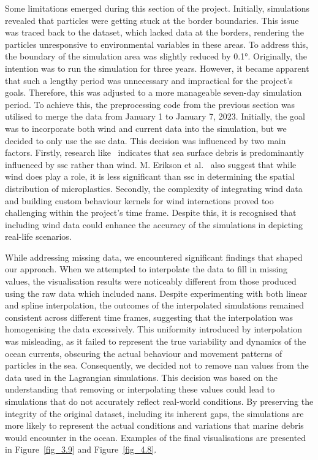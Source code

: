 Some limitations emerged during this section of the project. Initially,  simulations revealed that particles were getting stuck at the border boundaries. This issue was traced back to the dataset, which lacked data at the borders, rendering the particles unresponsive to environmental variables in these areas. To address this, the boundary of the simulation area was slightly reduced by 0.1°. Originally, the intention was to run the simulation for three years. However, it became apparent that such a lengthy period was unnecessary and impractical for the project's goals. Therefore, this was adjusted to a more manageable seven-day simulation period. To achieve this, the preprocessing code from the previous section was utilised to merge the data from January 1 to January 7, 2023. Initially, the goal was to incorporate both wind and current data into the simulation, but we decided to only use the \acrshort{ssc} data. This decision was influenced by two main factors. Firstly, research like~\cite{48} indicates that sea surface debris is predominantly influenced by \acrshort{ssc} rather than wind. M. Erikson et al.~\cite{48} also suggest that while wind does play a role, it is less significant than \acrshort{ssc} in determining the spatial distribution of microplastics. Secondly, the complexity of integrating wind data and building custom behaviour kernels for wind interactions proved too challenging within the project's time frame. Despite this, it is recognised that including wind data could enhance the accuracy of the simulations in depicting real-life scenarios.

While addressing missing data, we encountered significant findings that shaped our approach. When we attempted to interpolate the data to fill in missing values, the visualisation results were noticeably different from those produced using the raw data which included \acrshort{nan}s. Despite experimenting with both linear and spline interpolation, the outcomes of the interpolated simulations remained consistent across different time frames, suggesting that the interpolation was homogenising the data excessively. This uniformity introduced by interpolation was misleading, as it failed to represent the true variability and dynamics of the ocean currents, obscuring the actual behaviour and movement patterns of particles in the sea. Consequently, we decided not to remove \acrshort{nan} values from the data used in the Lagrangian simulations. This decision was based on the understanding that removing or interpolating these values could lead to simulations that do not accurately reflect real-world conditions. By preserving the integrity of the original dataset, including its inherent gaps, the simulations are more likely to represent the actual conditions and variations that marine debris would encounter in the ocean. Examples of the final visualisations are presented in Figure~\ref{fig_3.9} and Figure~\ref{fig_4.8}.

